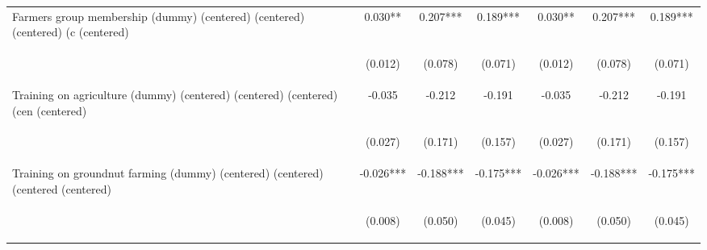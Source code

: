 \begin{center}
\begin{tabular}{lcccccc}
Farmers group membership (dummy)  (centered) (centered) (centered) (c (centered) & 0.030** & 0.207*** & 0.189*** & 0.030** & 0.207*** & 0.189*** \\
\vspace{4pt} & \begin{footnotesize}(0.012)\end{footnotesize} & \begin{footnotesize}(0.078)\end{footnotesize} & \begin{footnotesize}(0.071)\end{footnotesize} & \begin{footnotesize}(0.012)\end{footnotesize} & \begin{footnotesize}(0.078)\end{footnotesize} & \begin{footnotesize}(0.071)\end{footnotesize} \\
Training on agriculture (dummy) (centered) (centered) (centered) (cen (centered) & -0.035 & -0.212 & -0.191 & -0.035 & -0.212 & -0.191 \\
\vspace{4pt} & \begin{footnotesize}(0.027)\end{footnotesize} & \begin{footnotesize}(0.171)\end{footnotesize} & \begin{footnotesize}(0.157)\end{footnotesize} & \begin{footnotesize}(0.027)\end{footnotesize} & \begin{footnotesize}(0.171)\end{footnotesize} & \begin{footnotesize}(0.157)\end{footnotesize} \\
Training on groundnut farming (dummy) (centered) (centered) (centered (centered) & -0.026*** & -0.188*** & -0.175*** & -0.026*** & -0.188*** & -0.175*** \\
\vspace{4pt} & \begin{footnotesize}(0.008)\end{footnotesize} & \begin{footnotesize}(0.050)\end{footnotesize} & \begin{footnotesize}(0.045)\end{footnotesize} & \begin{footnotesize}(0.008)\end{footnotesize} & \begin{footnotesize}(0.050)\end{footnotesize} & \begin{footnotesize}(0.045)\end{footnotesize} \\

\end{tabular}
\end{center}
